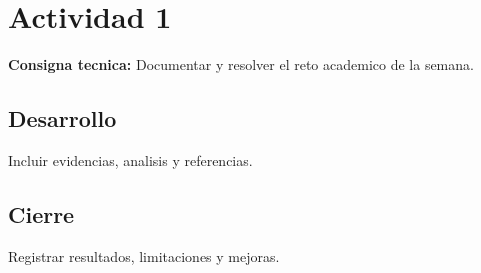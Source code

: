 \documentclass[spanish,letterpaper,oneside]{article}
\begin{document}
\templatePortrait
\templatePagecfg
\onehalfspacing

\section{Actividad 1}
\textbf{Consigna tecnica:} Documentar y resolver el reto academico de la semana.

\subsection{Desarrollo}
Incluir evidencias, analisis y referencias.

\subsection{Cierre}
Registrar resultados, limitaciones y mejoras.



\end{document}
